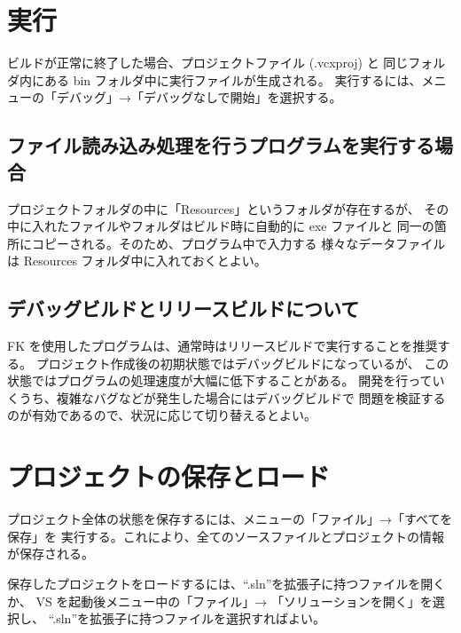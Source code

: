 \documentclass[a4paper]{jsarticle}
\begin{document}
\section{実行}
ビルドが正常に終了した場合、プロジェクトファイル (.vcxproj) と
同じフォルダ内にある bin フォルダ中に実行ファイルが生成される。
実行するには、メニューの「デバッグ」→「デバッグなしで開始」を選択する。

\subsection{ファイル読み込み処理を行うプログラムを実行する場合}
プロジェクトフォルダの中に「Resources」というフォルダが存在するが、
その中に入れたファイルやフォルダはビルド時に自動的に exe ファイルと
同一の箇所にコピーされる。そのため、プログラム中で入力する
様々なデータファイルは Resources フォルダ中に入れておくとよい。

\subsection{デバッグビルドとリリースビルドについて}
FK を使用したプログラムは、通常時はリリースビルドで実行することを推奨する。
プロジェクト作成後の初期状態ではデバッグビルドになっているが、
この状態ではプログラムの処理速度が大幅に低下することがある。
開発を行っていくうち、複雑なバグなどが発生した場合にはデバッグビルドで
問題を検証するのが有効であるので、状況に応じて切り替えるとよい。

\section{プロジェクトの保存とロード}
プロジェクト全体の状態を保存するには、メニューの「ファイル」→「すべてを保存」を
実行する。これにより、全てのソースファイルとプロジェクトの情報が保存される。

保存したプロジェクトをロードするには、``.sln''を拡張子に持つファイルを開くか、
VS を起動後メニュー中の「ファイル」→ 「ソリューションを開く」を選択し、
``.sln''を拡張子に持つファイルを選択すればよい。
\end{document}
